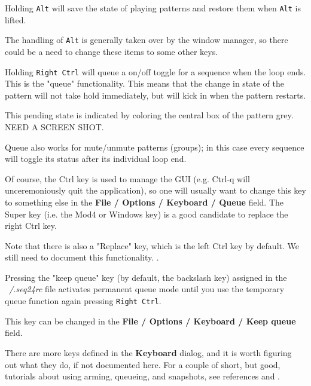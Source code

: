    Holding \texttt{Alt} will save the state of playing patterns and restore
   them when \texttt{Alt} is lifted.

   The handling of \texttt{Alt} is generally taken over by the window
   manager, so there could be a need to change these items to some other
   keys.


	Holding \texttt{Right Ctrl} will queue a on/off toggle for a 
	sequence when the loop ends. This is the "queue" functionality.
   This means that the change in state of the pattern will not take hold
   immediately, but will kick in when the pattern restarts.

   This pending state is indicated by coloring the central box of the
   pattern grey.  NEED A SCREEN SHOT.

   Queue also works for mute/unmute 
	patterns (groups); in this case every sequence will toggle 
	its status after its individual loop end. 

   Of course, the Ctrl key is used to manage the GUI (e.g. Ctrl-q will
   unceremoniously quit the application), so one will usually want to change
   this key to something else in the
   \textbf{File / Options / Keyboard / Queue} field.
   The Super key (i.e. the Mod4 or Windows key) is a good candidate to
   replace the right Ctrl key.

   Note that there is also a "Replace" key, which is the left Ctrl key by
   default.  We still need to document this functionality.
   .

	Pressing the "keep queue" key (by default, the backslash key)
   assigned in the \textsl{~/.seq24rc} file
	activates permanent queue mode until you use the temporary 
	queue function again pressing \texttt{Right Ctrl}. 

   This key can be changed in the
   \textbf{File / Options / Keyboard / Keep queue} field.

   There are more keys defined in the \textbf{Keyboard} dialog, and it is
   worth figuring out what they do, if not documented here.
   For a couple of short, but good, tutorials about using arming, queueing,
   and snapshots, see references \cite{wootangent1}
   and \cite{wootangent2}.

